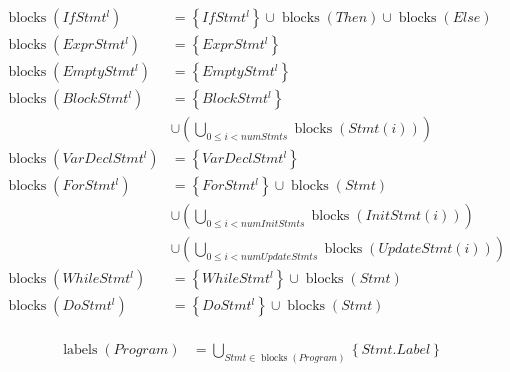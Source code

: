 \documentclass{article}
\DeclareMathOperator{\blocks}{blocks}
\DeclareMathOperator{\labels}{labels}
\begin{document}
\begin{equation*}
\begin{split}
\blocks(IfStmt^l) 	&= \left\{ {IfStmt^l} \right\}
				 \cup \blocks(Then) \cup \blocks(Else) \\
\blocks(ExprStmt^l) 	&= \left\{ {ExprStmt^l} \right\} \\ 
\blocks(EmptyStmt^l) 	&= \left\{ {EmptyStmt^l} \right\} \\ 
\blocks(BlockStmt^l) 	&= \left\{ {BlockStmt^l} \right\} \\
			&\cup \left( \bigcup_{0 \leq i < numStmts} 
				\blocks(Stmt(i)) \right) \\
\blocks(VarDeclStmt^l) 	&= \left\{ {VarDeclStmt^l} \right\} \\ 
\blocks(ForStmt^l) 	&= \left\{ {ForStmt^l} \right\} \cup \blocks(Stmt) \\
			&\cup \left( \bigcup_{0 \leq i < numInitStmts}
				\blocks(InitStmt(i)) \right) \\
			&\cup \left( \bigcup_{0 \leq i < numUpdateStmts}
				\blocks(UpdateStmt(i)) \right) \\
\blocks(WhileStmt^l) 	&= \left\{ {WhileStmt^l} \right\} \cup \blocks(Stmt) \\ 
\blocks(DoStmt^l) 	&= \left\{ {DoStmt^l} \right\} \cup \blocks(Stmt) \\ 
\end{split}
\end{equation*}

\begin{equation*}
\begin{split}
\labels(Program) &= \bigcup_{Stmt \in \blocks(Program)} 
			\left\{ {Stmt.Label} \right\} \\
\end{split}
\end{equation*}
\end{document}
